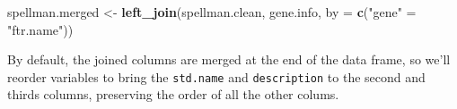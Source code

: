 \documentclass[]{book}
\newenvironment{Shaded}{\begin{snugshade}}{\end{snugshade}}
\newcommand{\DataTypeTok}[1]{\textcolor[rgb]{0.13,0.29,0.53}{#1}}
\newcommand{\KeywordTok}[1]{\textcolor[rgb]{0.13,0.29,0.53}{\textbf{#1}}}
\newcommand{\NormalTok}[1]{#1}
\newcommand{\OperatorTok}[1]{\textcolor[rgb]{0.81,0.36,0.00}{\textbf{#1}}}
\newcommand{\StringTok}[1]{\textcolor[rgb]{0.31,0.60,0.02}{#1}}
\theoremstyle{definition}
\theoremstyle{definition}
\theoremstyle{definition}
\theoremstyle{remark}
\begin{document}
\begin{Shaded}
\begin{Highlighting}[]
\NormalTok{spellman.merged <-}
\StringTok{  }\KeywordTok{left_join}\NormalTok{(spellman.clean, gene.info, }\DataTypeTok{by =} \KeywordTok{c}\NormalTok{(}\StringTok{"gene"}\NormalTok{ =}\StringTok{ "ftr.name"}\NormalTok{))}
\end{Highlighting}
\end{Shaded}

By default, the joined columns are merged at the end of the data frame,
so we'll reorder variables to bring the \texttt{std.name} and
\texttt{description} to the second and thirds columns, preserving the
order of all the other colums.

\begin{Shaded}
\begin{Highlighting}[]
\NormalTok{spellman.merged }\OperatorTok{%
\StringTok{  }\KeywordTok{select}\NormalTok{(gene, std.name, description, }\KeywordTok{everything}\NormalTok{())}

}
\end{Highlighting}
\end{Shaded}
\end{document}
